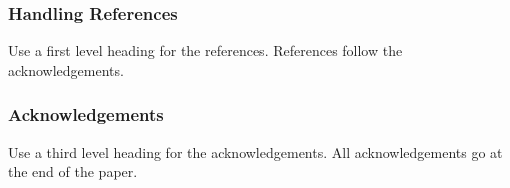 \documentclass[a4paper]{article}
\begin{document}
\subsubsection{Handling References}

Use a first level heading for the references. References follow the
acknowledgements.


\subsubsection{Acknowledgements}

Use a third level heading for the acknowledgements. All acknowledgements
go at the end of the paper.


 

\end{document}
